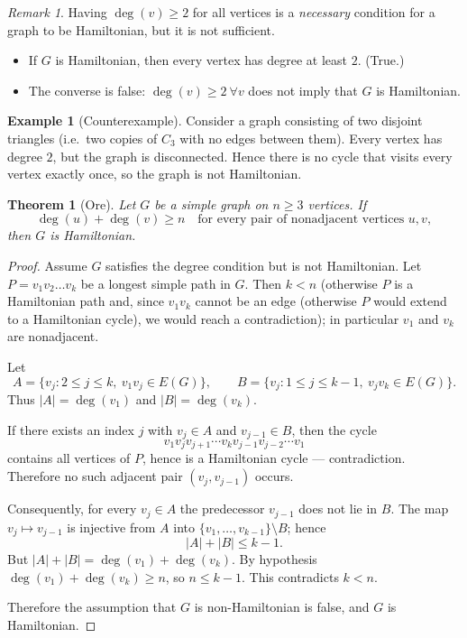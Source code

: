 \documentclass{article}
\theoremstyle{plain}
\newtheorem{theorem}{Theorem}
\theoremstyle{definition}
\newtheorem{example}{Example}
\theoremstyle{remark}
\newtheorem{remark}{Remark}
\begin{document}
\begin{remark}
Having $\deg(v)\ge 2$ for all vertices is a \emph{necessary} condition for a
graph to be Hamiltonian, but it is not sufficient.
\end{remark}

\begin{itemize}
    \item If \(G\) is Hamiltonian, then every vertex has degree at least \(2\).
          (True.)
    \item The converse is false: \(\deg(v)\ge 2\ \forall v\) does not imply that \(G\) is Hamiltonian.
\end{itemize}

\begin{example}[Counterexample]
Consider a graph consisting of two disjoint triangles (i.e.\ two copies of
\(C_3\) with no edges between them). Every vertex has degree \(2\), but the
graph is disconnected. Hence there is no cycle that visits every vertex
exactly once, so the graph is not Hamiltonian.
\end{example}
\begin{theorem}[Ore]
Let \(G\) be a simple graph on \(n\ge3\) vertices. If
\[
\deg(u)+\deg(v)\ge n
\quad\text{for every pair of nonadjacent vertices }u,v,
\]
then \(G\) is Hamiltonian.
\end{theorem}

\begin{proof}
Assume \(G\) satisfies the degree condition but is not Hamiltonian. Let
\(P=v_1v_2\ldots v_k\) be a longest simple path in \(G\). Then \(k<n\)
(otherwise \(P\) is a Hamiltonian path and, since \(v_1v_k\) cannot be an
edge (otherwise \(P\) would extend to a Hamiltonian cycle), we would reach a
contradiction); in particular \(v_1\) and \(v_k\) are nonadjacent.

Let
\[
A=\{v_j: 2\le j\le k,\ v_1v_j\in E(G)\},\qquad
B=\{v_j: 1\le j\le k-1,\ v_jv_k\in E(G)\}.
\]
Thus \(|A|=\deg(v_1)\) and \(|B|=\deg(v_k)\).

If there exists an index \(j\) with \(v_j\in A\) and \(v_{j-1}\in B\), then
the cycle
\[
v_1v_jv_{j+1}\cdots v_kv_{j-1}v_{j-2}\cdots v_1
\]
contains all vertices of \(P\), hence is a Hamiltonian cycle — contradiction.
Therefore no such adjacent pair \((v_j,v_{j-1})\) occurs.

Consequently, for every \(v_j\in A\) the predecessor \(v_{j-1}\) does not lie
in \(B\). The map \(v_j\mapsto v_{j-1}\) is injective from \(A\) into
\(\{v_1,\dots,v_{k-1}\}\setminus B\); hence
\[
|A| + |B| \le k-1.
\]
But \(|A|+|B|=\deg(v_1)+\deg(v_k)\). By hypothesis
\(\deg(v_1)+\deg(v_k)\ge n\), so \(n \le k-1\). This contradicts \(k<n\).

Therefore the assumption that \(G\) is non-Hamiltonian is false, and \(G\)
is Hamiltonian.
\end{proof}
\end{document}
